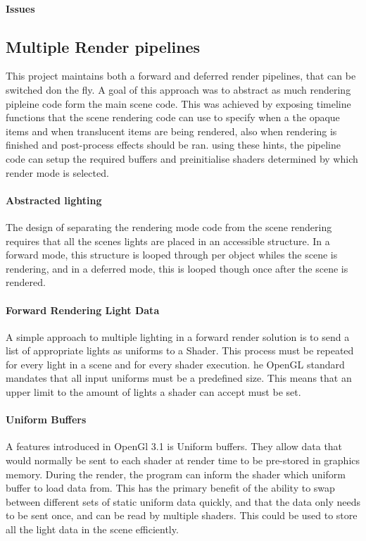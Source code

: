 \documentclass[conference]{acmsiggraph}
\begin{document}
\paragraph{Issues}

\subsection{Multiple Render pipelines}
This project maintains both a forward and deferred render pipelines, that can be switched don the fly. A goal of this approach was to abstract as much rendering pipleine code form the main scene code. This was achieved by exposing timeline functions that the scene rendering code can use to specify when a the opaque items and when translucent items are being rendered, also when rendering is finished and post-process effects should be ran. using these hints, the pipeline code can setup the required buffers and preinitialise shaders determined by which render mode is selected.

\paragraph{Abstracted lighting}
The design of separating the rendering mode code from the scene rendering requires that all the scenes lights are placed in an accessible structure. In a forward mode, this structure is looped through per object whiles the scene is rendering, and in a deferred mode, this is looped though once after the scene is rendered.

\paragraph{Forward Rendering Light Data}
A simple approach to multiple lighting in a forward render solution is to send a list of appropriate lights as uniforms to a Shader.
This process must be repeated for every light in a scene and for every shader execution.  he OpenGL standard mandates that all input uniforms must be a predefined size. This means that an upper limit to the amount of lights a shader can accept must be set.

\paragraph{Uniform Buffers}
A features introduced in OpenGl 3.1 is Uniform buffers. They allow data that would normally be sent to each shader at render time to be pre-stored in graphics memory. During the render, the program can inform the shader which uniform buffer to load data from. This has the primary benefit of the ability to swap between different sets of static uniform data quickly, and that the data only needs to be sent once, and can be read by multiple shaders. This could be used to store all the light data in the scene efficiently.
\end{document}
